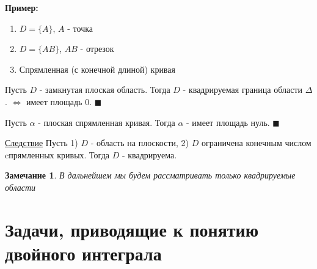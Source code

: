 \documentclass[a4paper, 14pt]{report}
\newtheorem{note}{Замечание}[section]
\begin{document}
\hfill

\textbf{Пример:}
\begin{enumerate}
    \item[1)] $D = \{ A \}$, $A$ - точка
    \item[2)] $D = \{ AB \}$, $AB$ - отрезок
    \item[3)] Спрямленная (с конечной длиной) кривая
\end{enumerate}

\begin{theorem}
    Пусть $D$ - замкнутая плоская область. Тогда $D$ - квадрируемая граница области $\Delta$. $\Leftrightarrow$ имеет площадь 0. $\blacksquare$
\end{theorem}

\hfill

\begin{theorem}
    Пусть $\alpha$ - плоская спрямленная кривая. Тогда $\alpha$ - имеет площадь нуль. $\blacksquare$
\end{theorem}

\hfill

\underline{Следствие} Пусть 1) $D$ - область на плоскости, 2) $D$ ограничена конечным числом cпрямленных кривых. Тогда $D$ - квадрируема.

\hfill

\begin{note}
    В дальнейшем мы будем рассматривать только квадрируемые области
\end{note}

\section{Задачи, приводящие к понятию двойного интеграла}
\end{document}
